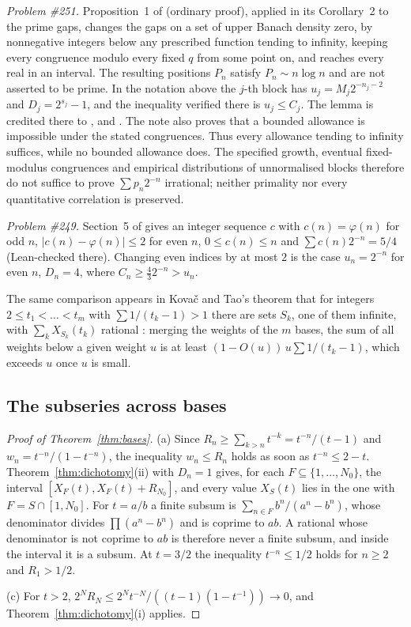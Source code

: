 \documentclass[11pt]{article}
\begin{document}
\emph{Problem \#251.}  Proposition~1 of \cite{plectis251} (ordinary proof),
applied in its Corollary~2 to the prime gaps, changes the gaps on a set of upper
Banach density zero, by nonnegative integers below any prescribed function
tending to infinity, keeping every congruence modulo every fixed $q$ from some
point on, and reaches every real in an interval.  The resulting positions
$P_n$ satisfy $P_n\sim n\log n$ and are not asserted to be prime.  In the notation above the $j$-th block has $u_j=M_j2^{-n_j-2}$ and
$D_j=2^{s_j}-1$, and the inequality verified there is $u_j\le C_j$.  The
lemma is credited there to \cite{fridy1966}, \cite[Lemma~4]{crmarickovac2025}
and \cite[Lemma~5.1]{kovactao2024}.  The note also proves that a bounded
allowance is impossible under the stated congruences.  Thus every allowance
tending to infinity suffices, while no bounded allowance does.  The specified
growth, eventual fixed-modulus congruences and empirical distributions of
unnormalised blocks therefore do not suffice to prove
$\sum p_n2^{-n}$ irrational; neither primality nor every quantitative
correlation is preserved.

\emph{Problem \#249.}  Section~5 of \cite{plectis249} gives an integer sequence
$c$ with $c(n)=\varphi(n)$ for odd $n$, $|c(n)-\varphi(n)|\le2$ for even $n$,
$0\le c(n)\le n$ and $\sum c(n)2^{-n}=5/4$ (Lean-checked there).  Changing even
indices by at most $2$ is the case $u_n=2^{-n}$ for even $n$, $D_n=4$, where
$C_n\ge\tfrac43 2^{-n}>u_n$.

The same comparison appears in Kova\v{c} and Tao's theorem that for integers
$2\le t_1<\dots<t_m$ with $\sum1/(t_k-1)>1$ there are sets $S_k$, one of them
infinite, with $\sum_kX_{S_k}(t_k)$ rational \cite[Theorem~2.3]{kovactao2024}:
merging the weights of the $m$ bases, the sum of all weights below a given
weight $u$ is at least $(1-O(u))\,u\sum1/(t_k-1)$, which exceeds $u$ once $u$
is small.

\subsection{The subseries across bases}\label{sec:bases}

\begin{proof}[Proof of Theorem~\ref{thm:bases}]
(a) Since $R_n\ge\sum_{k>n}t^{-k}=t^{-n}/(t-1)$ and
$w_n=t^{-n}/(1-t^{-n})$, the inequality $w_n\le R_n$ holds as soon as
$t^{-n}\le2-t$.  Theorem~\ref{thm:dichotomy}(ii) with $D_n=1$ gives, for
each $F\subseteq\{1,\dots,N_0\}$, the interval $[X_F(t),X_F(t)+R_{N_0}]$, and every
value $X_S(t)$ lies in the one with $F=S\cap[1,N_0]$.  For $t=a/b$ a finite subsum is
$\sum_{n\in F}b^n/(a^n-b^n)$, whose denominator divides $\prod(a^n-b^n)$ and is
coprime to $ab$.  A rational whose denominator is not coprime to $ab$ is
therefore never a finite subsum, and inside the interval it is a subsum.  At
$t=3/2$ the inequality $t^{-n}\le1/2$ holds for $n\ge2$ and $R_1>1/2$.

(c) For $t>2$, $2^NR_N\le2^Nt^{-N}/((t-1)(1-t^{-1}))\to0$, and
Theorem~\ref{thm:dichotomy}(i) applies.
\end{proof}
\end{document}
